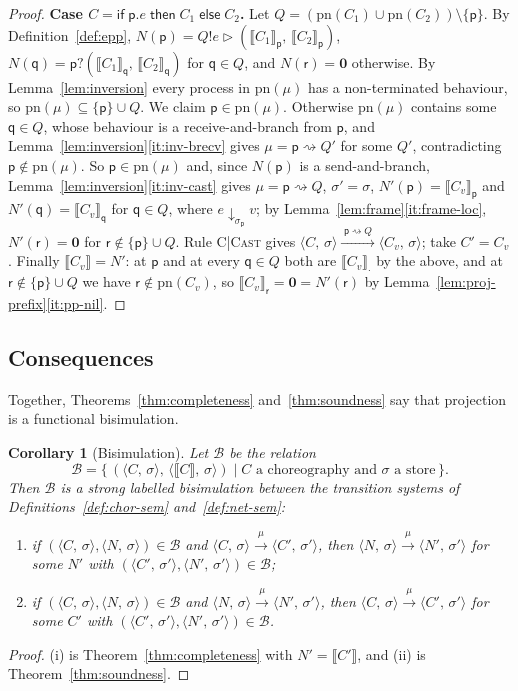 \documentclass[11pt]{article}
\theoremstyle{plain}
\newtheorem{corollary}[theorem]{Corollary}
\theoremstyle{definition}
\theoremstyle{remark}
\newcommand{\kw}[1]{\mathsf{#1}}
\newcommand{\kif}{\kw{if}\;}
\newcommand{\kthen}{\;\kw{then}\;}
\newcommand{\kelse}{\;\kw{else}\;}
\newcommand{\nil}{\mathbf{0}}
\newcommand{\pp}{\mathsf{p}}
\newcommand{\qq}{\mathsf{q}}
\newcommand{\rr}{\mathsf{r}}
\newcommand{\pn}{\mathrm{pn}}
\newcommand{\eval}[3]{#1 \downarrow_{#2} #3}
\newcommand{\conf}[2]{\langle #1,\, #2\rangle}
\newcommand{\lto}[1]{\xrightarrow{\;#1\;}}
\newcommand{\proj}[2]{\llbracket #1 \rrbracket_{#2}}
\newcommand{\projn}[1]{\llbracket #1 \rrbracket}
\newcommand{\cast}[2]{#1 \rightsquigarrow #2}
\newcommand{\rn}[1]{{\normalfont\scshape #1}}
\newcommand{\ifcond}[3]{\kif #1 \kthen #2 \kelse #3}
\newcommand{\sendbr}[4]{#1!#2 \mathbin{\triangleright} (#3,\, #4)}
\newcommand{\recvbr}[3]{#1?(#2,\, #3)}
\newcommand{\case}[1]{\medskip\noindent\textbf{Case #1.}\;}
\newcommand{\Bis}{\mathcal{B}}
\begin{document}
\begin{proof}
  \case{$C = \ifcond{\pp.e}{C_1}{C_2}$}
  Let $Q = (\pn(C_1)\cup\pn(C_2))\setminus\{\pp\}$.  By
  Definition~\ref{def:epp}, $N(\pp) = \sendbr{Q}{e}{\proj{C_1}{\pp}}{\proj{C_2}{\pp}}$,
  $N(\qq) = \recvbr{\pp}{\proj{C_1}{\qq}}{\proj{C_2}{\qq}}$ for $\qq\in Q$, and
  $N(\rr) = \nil$ otherwise.  By Lemma~\ref{lem:inversion} every process in
  $\pn(\mu)$ has a non-terminated behaviour, so $\pn(\mu)\subseteq\{\pp\}\cup Q$.
  We claim $\pp\in\pn(\mu)$.  Otherwise $\pn(\mu)$ contains some $\qq\in Q$,
  whose behaviour is a receive-and-branch from $\pp$, and
  Lemma~\ref{lem:inversion}\ref{it:inv-brecv} gives $\mu = \cast{\pp}{Q'}$ for
  some $Q'$, contradicting $\pp\notin\pn(\mu)$.  So $\pp\in\pn(\mu)$ and, since
  $N(\pp)$ is a send-and-branch, Lemma~\ref{lem:inversion}\ref{it:inv-cast}
  gives $\mu = \cast{\pp}{Q}$, $\sigma' = \sigma$, $N'(\pp) = \proj{C_v}{\pp}$
  and $N'(\qq) = \proj{C_v}{\qq}$ for $\qq\in Q$, where $\eval{e}{\sigma_\pp}{v}$;
  by Lemma~\ref{lem:frame}\ref{it:frame-loc}, $N'(\rr) = \nil$ for
  $\rr\notin\{\pp\}\cup Q$.  Rule \rn{C|Cast} gives
  $\conf{C}{\sigma}\lto{\cast{\pp}{Q}}\conf{C_v}{\sigma}$; take $C' = C_v$.
  Finally $\projn{C_v} = N'$: at $\pp$ and at every $\qq\in Q$ both are
  $\proj{C_v}{\cdot}$ by the above, and at $\rr\notin\{\pp\}\cup Q$ we have
  $\rr\notin\pn(C_v)$, so $\proj{C_v}{\rr} = \nil = N'(\rr)$ by
  Lemma~\ref{lem:proj-prefix}\ref{it:pp-nil}.
\end{proof}

\subsection{Consequences}

Together, Theorems~\ref{thm:completeness} and~\ref{thm:soundness} say that
projection is a functional bisimulation.

\begin{corollary}[Bisimulation]\label{cor:bisim}
  Let $\Bis$ be the relation
  \[
    \Bis = \{\,(\conf{C}{\sigma},\, \conf{\projn{C}}{\sigma}) \mid C \text{ a choreography and } \sigma \text{ a store}\,\}.
  \]
  Then $\Bis$ is a strong labelled bisimulation between the transition
  systems of Definitions~\ref{def:chor-sem} and~\ref{def:net-sem}:
  \begin{enumerate}[label=(\roman*),nosep]
  \item if $(\conf{C}{\sigma}, \conf{N}{\sigma})\in\Bis$ and
    $\conf{C}{\sigma}\lto{\mu}\conf{C'}{\sigma'}$, then
    $\conf{N}{\sigma}\lto{\mu}\conf{N'}{\sigma'}$ for some $N'$ with
    $(\conf{C'}{\sigma'}, \conf{N'}{\sigma'})\in\Bis$;
  \item if $(\conf{C}{\sigma}, \conf{N}{\sigma})\in\Bis$ and
    $\conf{N}{\sigma}\lto{\mu}\conf{N'}{\sigma'}$, then
    $\conf{C}{\sigma}\lto{\mu}\conf{C'}{\sigma'}$ for some $C'$ with
    $(\conf{C'}{\sigma'}, \conf{N'}{\sigma'})\in\Bis$.
  \end{enumerate}
\end{corollary}
\begin{proof}
  (i) is Theorem~\ref{thm:completeness} with $N' = \projn{C'}$, and (ii) is
  Theorem~\ref{thm:soundness}.
\end{proof}
\end{document}
